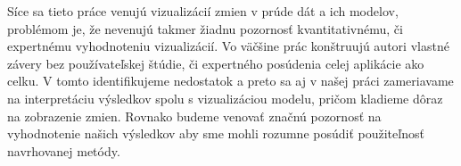 \label{fig:vis-concept-transformation-map}

\label{fig:vviz-concept-graphs}

Síce sa tieto práce venujú vizualizácií zmien v prúde dát a ich modelov, problémom je, že nevenujú takmer žiadnu pozornosť kvantitativnému, či expertnému vyhodnoteniu vizualizácií. Vo väčšine prác konštruujú autori vlastné závery bez používateľskej štúdie, či expertného posúdenia celej aplikácie ako celku. V tomto identifikujeme nedostatok a preto sa aj v našej práci zameriavame na interpretáciu výsledkov spolu s vizualizáciou modelu, pričom kladieme dôraz na zobrazenie zmien. Rovnako budeme venovať značnú pozornosť na vyhodnotenie našich výsledkov aby sme mohli rozumne posúdiť použiteľnosť navrhovanej metódy.







